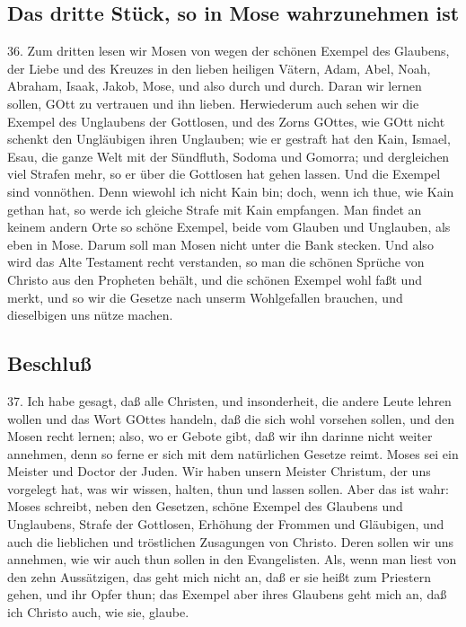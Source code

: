 \subsection{Das dritte Stück, so in Mose wahrzunehmen ist}

36. Zum dritten lesen wir Mosen von wegen der schönen Exempel des Glaubens, der Liebe und des Kreuzes in den lieben heiligen Vätern, Adam, Abel, Noah, Abraham, Isaak, Jakob, Mose, und also durch und durch. Daran wir lernen sollen, GOtt zu vertrauen und ihn lieben. Herwiederum auch sehen wir die Exempel des Unglaubens der Gottlosen, und des Zorns GOttes, wie GOtt nicht schenkt den Ungläubigen ihren Unglauben; wie er gestraft hat den Kain, Ismael, Esau, die ganze Welt mit der Sündfluth, Sodoma und Gomorra; und dergleichen viel Strafen mehr, so er über die Gottlosen hat gehen lassen. Und die Exempel sind vonnöthen. Denn wiewohl ich nicht Kain bin; doch, wenn ich thue, wie Kain gethan hat, so werde ich gleiche Strafe mit Kain empfangen. Man findet an keinem andern Orte so schöne Exempel, beide vom Glauben und Unglauben, als eben in Mose. Darum soll man Mosen nicht unter die Bank stecken. Und also wird das Alte Testament recht verstanden, so man die schönen Sprüche von Christo aus den Propheten behält, und die schönen Exempel wohl faßt und merkt, und so wir die Gesetze nach unserm Wohlgefallen brauchen, und dieselbigen uns nütze machen.

\subsection{Beschluß}

37. Ich habe gesagt, daß alle Christen, und insonderheit, die andere Leute lehren wollen und das Wort GOttes handeln, daß die sich wohl vorsehen sollen, und den Mosen recht lernen; also, wo er Gebote gibt, daß wir ihn darinne nicht weiter annehmen, denn so ferne er sich mit dem natürlichen Gesetze reimt. Moses sei ein Meister und Doctor der Juden. Wir haben unsern Meister Christum, der uns vorgelegt hat, was wir wissen, halten, thun und lassen sollen. Aber das ist wahr: Moses schreibt, neben den Gesetzen, schöne Exempel des Glaubens und Unglaubens, Strafe der Gottlosen, Erhöhung der Frommen und Gläubigen, und auch die lieblichen und tröstlichen Zusagungen von Christo. Deren sollen wir uns annehmen, wie wir auch thun sollen in den Evangelisten. Als, wenn man liest von den zehn Aussätzigen, das geht mich nicht an, daß er sie heißt zum Priestern gehen, und ihr Opfer thun; das Exempel aber ihres Glaubens geht mich an, daß ich Christo auch, wie sie, glaube.

